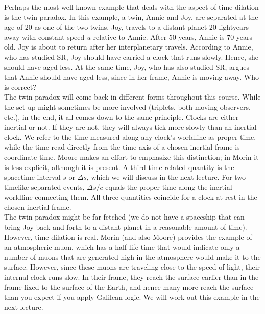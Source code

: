 \documentclass[12pt]{article}
\begin{document}
\noindent
Perhaps the most well-known example that deals with the aspect of time dilation is the twin paradox. In this example, a twin, Annie and Joy, are separated at the age of 20 as one of the two twins, Joy, travels to a distant planet 20 lightyears away with constant speed $u$ relative to Annie. After 50 years, Annie is 70 years old. Joy is about to return after her interplanetary travels. According to Annie, who has studied SR, Joy should have carried a clock that runs slowly. Hence, she should have aged less. At the same time, Joy, who has also studied SR, argues that Annie should have aged less, since in her frame, Annie is moving away. Who is correct? \\

\noindent
The twin paradox will come back in different forms throughout this course. While the set-up might sometimes be more involved (triplets, both moving observers, etc.), in the end, it all comes down to the same principle. Clocks are either inertial or not. If they are not, they will always tick more slowly than an inertial clock. We refer to the time measured along any clock's worldline as proper time, while the time read directly from the time axis of a chosen inertial frame is coordinate time. Moore makes an effort to emphasize this distinction; in Morin it is less explicit, although it is present. A third time-related quantity is the spacetime interval $s$ or $\Delta s$, which we will discuss in the next lecture. For two timelike-separated events, $\Delta s/c$ equals the proper time along the inertial worldline connecting them. All three quantities coincide for a clock at rest in the chosen inertial frame. \\

\noindent 
The twin paradox might be far-fetched (we do not have a spaceship that can bring Joy back and forth to a distant planet in a reasonable amount of time). However, time dilation is real. Morin (and also Moore) provides the example of an atmospheric muon, which has a half-life time that would indicate only a number of muons that are generated high in the atmosphere would make it to the surface. However, since these muons are traveling close to the speed of light, their internal clock runs slow. In their frame, they reach the surface earlier than in the frame fixed to the surface of the Earth, and hence many more reach the surface than you expect if you apply Galilean logic. We will work out this example in the next lecture. 

\end{document}

